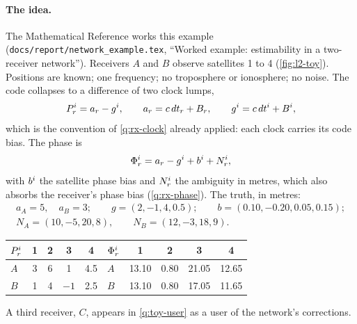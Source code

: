 \paragraph{The idea.} The Mathematical Reference works this example
(\texttt{docs/report/network\_example.tex}, ``Worked example: estimability in a
two-receiver network''). Receivers $A$ and $B$ observe satellites 1 to 4
(\cref{fig:l2-toy}). Positions are known; one frequency; no troposphere or
ionosphere; no noise. The code collapses to a difference of two clock lumps,
\begin{equation}
P^i_r = a_r - g^i, \qquad
a_r = c\,dt_r + B_r, \qquad
g^i = c\,dt^i + B^i,
\label{eq:l2-code}
\end{equation}
which is the convention of \cref{q:rx-clock} already applied: each clock carries
its code bias. The phase is
\begin{equation}
\Phi^i_r = a_r - g^i + b^i + N^i_r,
\label{eq:l2-phase}
\end{equation}
with $b^i$ the satellite phase bias and $N^i_r$ the ambiguity in metres,
which also absorbs the receiver's phase bias (\cref{q:rx-phase}). The truth, in
metres:
\begin{gather*}
a_A = 5,\quad a_B = 3;\qquad g = (2, -1, 4, 0.5);\qquad b = (0.10, -0.20, 0.05, 0.15);\\
N_A = (10, -5, 20, 8),\qquad N_B = (12, -3, 18, 9).
\end{gather*}
\begin{center}\small
\begin{tabular}{@{}lcccc@{\qquad}lcccc@{}}
\toprule
$P^i_r$ & 1 & 2 & 3 & 4 & $\Phi^i_r$ & 1 & 2 & 3 & 4 \\
\midrule
$A$ & 3 & 6 & 1 & 4.5 & $A$ & 13.10 & 0.80 & 21.05 & 12.65 \\
$B$ & 1 & 4 & $-1$ & 2.5 & $B$ & 13.10 & 0.80 & 17.05 & 11.65 \\
\bottomrule
\end{tabular}
\end{center}
A third receiver, $C$, appears in \cref{q:toy-user} as a user of the network's
corrections.

